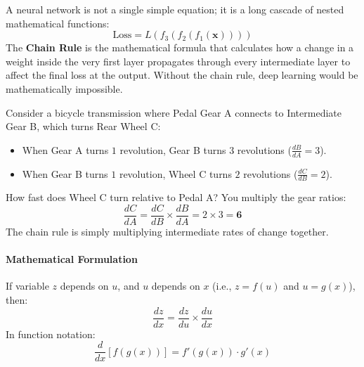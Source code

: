 \begin{keyidea}
A neural network is not a single simple equation; it is a long cascade of nested mathematical functions:
\begin{equation*}
\text{Loss} = L(f_3(f_2(f_1(\mathbf{x}))))
\end{equation*}
The \textbf{Chain Rule} is the mathematical formula that calculates how a change in a weight inside the very first layer propagates through every intermediate layer to affect the final loss at the output. Without the chain rule, deep learning would be mathematically impossible.
\end{keyidea}

\begin{analogy}
Consider a bicycle transmission where Pedal Gear A connects to Intermediate Gear B, which turns Rear Wheel C:
\begin{itemize}
    \item When Gear A turns $1$ revolution, Gear B turns $3$ revolutions ($\frac{dB}{dA} = 3$).
    \item When Gear B turns $1$ revolution, Wheel C turns $2$ revolutions ($\frac{dC}{dB} = 2$).
\end{itemize}
How fast does Wheel C turn relative to Pedal A? You multiply the gear ratios:
\begin{equation*}
\frac{dC}{dA} = \frac{dC}{dB} \times \frac{dB}{dA} = 2 \times 3 = \mathbf{6}
\end{equation*}
The chain rule is simply multiplying intermediate rates of change together.
\end{analogy}

\paragraph{Mathematical Formulation}
If variable $z$ depends on $u$, and $u$ depends on $x$ (i.e., $z = f(u)$ and $u = g(x)$), then:
\begin{equation}
\frac{dz}{dx} = \frac{dz}{du} \times \frac{du}{dx}\label{eq:chain_rule}
\end{equation}
In function notation:
\begin{equation}
\frac{d}{dx}[f(g(x))] = f'(g(x)) \cdot g'(x)\label{eq:chain_rule_fn}
\end{equation}

